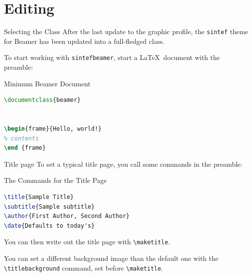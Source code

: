 \section{Editing}

\begin{frame}[fragile]{Selecting the Class}
After the last update to the graphic profile, the \texttt{sintef} theme for Beamer has been updated into a full-fledged class.

To start working with \texttt{sintefbeamer}, start a \LaTeX\ document with the preamble:
\begin{block}{Minimum Beamer Document}
\begin{lstlisting}[language=TeX]
\documentclass{beamer}


\begin{frame}{Hello, world!}
% contents
\end {frame}


\end{lstlisting}
\end{block}
\end{frame}

\begin{frame}[fragile]{Title page}
To set a typical title page, you call some commands in the preamble:
\begin{block}{The Commands for the Title Page}
\begin{lstlisting}[language=TeX]
\title{Sample Title}
\subtitle{Sample subtitle}
\author{First Author, Second Author}
\date{Defaults to today's}
\end{lstlisting}
\end{block}
You can then write out the title page with \verb|\maketitle|.

You can set a different background image than the default one with the \verb|\titlebackground| command, set before \verb|\maketitle|.
\end{frame}

